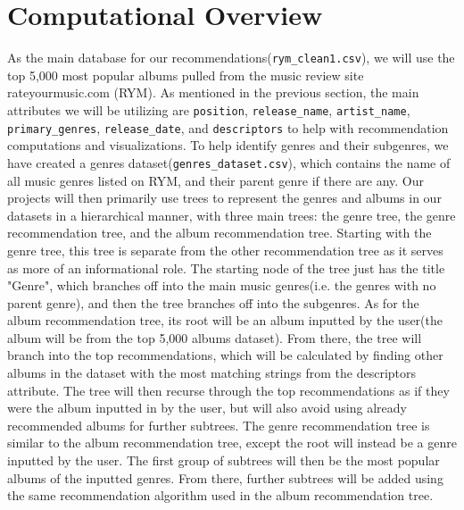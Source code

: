 \documentclass[fontsize=11pt]{article}
\begin{document}
\section*{Computational Overview} 
As the main database for our recommendations(\texttt{rym\_clean1.csv}), we will use the top 5,000 most popular albums pulled from the music review site rateyourmusic.com (RYM). As mentioned in the previous section, the main attributes we will be utilizing are \texttt{position}, \texttt{release\_name}, \texttt{artist\_name}, \texttt{primary\_genres}, \texttt{release\_date}, and \texttt{descriptors} to help with recommendation computations and visualizations. To help identify genres and their subgenres, we have created a genres dataset(\texttt{genres\_dataset.csv}), which contains the name of all music genres listed on RYM, and their parent genre if there are any. Our projects will then primarily use trees to represent the genres and albums in our datasets in a hierarchical manner, with three main trees: the genre tree, the genre recommendation tree, and the album recommendation tree. Starting with the genre tree, this tree is separate from the other recommendation tree as it serves as more of an informational role. The starting node of the tree just has the title "Genre", which branches off into the main music genres(i.e. the genres with no parent genre), and then the tree branches off into the subgenres. As for the album recommendation tree, its root will be an album inputted by the user(the album will be from the top 5,000 albums dataset). From there, the tree will branch into the top recommendations, which will be calculated by finding other albums in the dataset with the most matching strings from the descriptors attribute. The tree will then recurse through the top recommendations as if they were the album inputted in by the user, but will also avoid using already recommended albums for further subtrees. The genre recommendation tree is similar to the album recommendation tree, except the root will instead be a genre inputted by the user. The first group of subtrees will then be the most popular albums of the inputted genres. From there, further subtrees will be added using the same recommendation algorithm used in the album recommendation tree. \newline 
\end{document}
